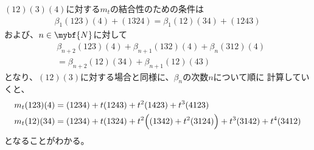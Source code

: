 	$(12)(3)(4)$に対する$m_t$の結合性のための条件は
	\begin{equation*}\begin{split} %
		\beta_1(123)(4)+(1324)=\beta_1(12)(34)+(1243)
	\end{split}\end{equation*} %
	および、$n\in\mybf{N}$に対して
	\begin{equation*}\begin{split} %
		&\beta_{n+2}(123)(4) +\beta_{n+1}(132)(4) +\beta_{n}(312)(4) \\
		&= \beta_{n+2}(12)(34)+\beta_{n+1}(12)(43)
	\end{split}\end{equation*} %
	となり、$(12)(3)$に対する場合と同様に、$\beta_n$の次数$n$について順に
	計算していくと、
	\begin{equation*}\begin{split} %
		m_t(123)(4) &= (1234)+ t(1243)+ t^2(1423)+ t^3(4123) \\
		m_t(12)(34) &= (1234)+ t(1324)+ t^2\Bigl((1342)+ t^2(3124)\Bigr)
		+ t^3(3142)+ t^4(3412)
	\end{split}\end{equation*} %
	となることがわかる。

